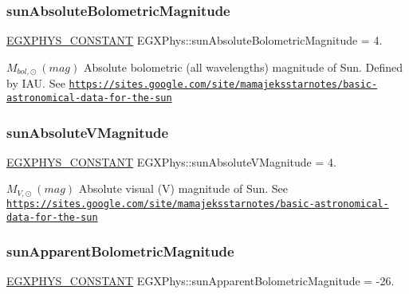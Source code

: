 \subsubsection{\texorpdfstring{sun\+Absolute\+Bolometric\+Magnitude}{sunAbsoluteBolometricMagnitude}}
{\footnotesize\ttfamily \mbox{\hyperlink{group___e_g_x_phys-_constants-_macros_ga76980d288494ce1714c9ac68a95ba702}{E\+G\+X\+P\+H\+Y\+S\+\_\+\+C\+O\+N\+S\+T\+A\+NT}} E\+G\+X\+Phys\+::sun\+Absolute\+Bolometric\+Magnitude = 4.}

$ M_{bol,\odot} \ (mag)$ Absolute bolometric (all wavelengths) magnitude of Sun. Defined by I\+AU. See \href{https://sites.google.com/site/mamajeksstarnotes/basic-astronomical-data-for-the-sun}{\tt https\+://sites.\+google.\+com/site/mamajeksstarnotes/basic-\/astronomical-\/data-\/for-\/the-\/sun} \mbox{\label{group___e_g_x_phys-_constants-_astrophysics-_solar_system-_sun-_magnitude_ga1b684bd33050a9567e1a931700be0df3}} 
\subsubsection{\texorpdfstring{sun\+Absolute\+V\+Magnitude}{sunAbsoluteVMagnitude}}
{\footnotesize\ttfamily \mbox{\hyperlink{group___e_g_x_phys-_constants-_macros_ga76980d288494ce1714c9ac68a95ba702}{E\+G\+X\+P\+H\+Y\+S\+\_\+\+C\+O\+N\+S\+T\+A\+NT}} E\+G\+X\+Phys\+::sun\+Absolute\+V\+Magnitude = 4.}

$ M_{V,\odot} \ (mag)$ Absolute visual (V) magnitude of Sun. See \href{https://sites.google.com/site/mamajeksstarnotes/basic-astronomical-data-for-the-sun}{\tt https\+://sites.\+google.\+com/site/mamajeksstarnotes/basic-\/astronomical-\/data-\/for-\/the-\/sun} \mbox{\label{group___e_g_x_phys-_constants-_astrophysics-_solar_system-_sun-_magnitude_ga3346344b395917685d2a52528bf63a43}} 
\subsubsection{\texorpdfstring{sun\+Apparent\+Bolometric\+Magnitude}{sunApparentBolometricMagnitude}}
{\footnotesize\ttfamily \mbox{\hyperlink{group___e_g_x_phys-_constants-_macros_ga76980d288494ce1714c9ac68a95ba702}{E\+G\+X\+P\+H\+Y\+S\+\_\+\+C\+O\+N\+S\+T\+A\+NT}} E\+G\+X\+Phys\+::sun\+Apparent\+Bolometric\+Magnitude = -\/26.}

